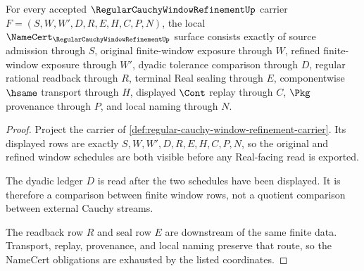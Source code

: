 \begin{theorem}
\label{thm:regular-cauchy-window-refinement-namecert-obligations}
For every accepted $\RegularCauchyWindowRefinementUp$ carrier $F=(S,W,W',D,R,E,H,C,P,N)$, the local $\NameCert_{\RegularCauchyWindowRefinementUp}$ surface consists exactly of source admission through $S$, original finite-window exposure through $W$, refined finite-window exposure through $W'$, dyadic tolerance comparison through $D$, regular rational readback through $R$, terminal Real sealing through $E$, componentwise $\hsame$ transport through $H$, displayed $\Cont$ replay through $C$, $\Pkg$ provenance through $P$, and local naming through $N$.
\end{theorem}
\begin{proof}
Project the carrier of \autoref{def:regular-cauchy-window-refinement-carrier}. Its displayed rows are exactly $S,W,W',D,R,E,H,C,P,N$, so the original and refined window schedules are both visible before any Real-facing read is exported.

The dyadic ledger $D$ is read after the two schedules have been displayed. It is therefore a comparison between finite window rows, not a quotient comparison between external Cauchy streams.

The readback row $R$ and seal row $E$ are downstream of the same finite data. Transport, replay, provenance, and local naming preserve that route, so the NameCert obligations are exhausted by the listed coordinates.
\end{proof}

